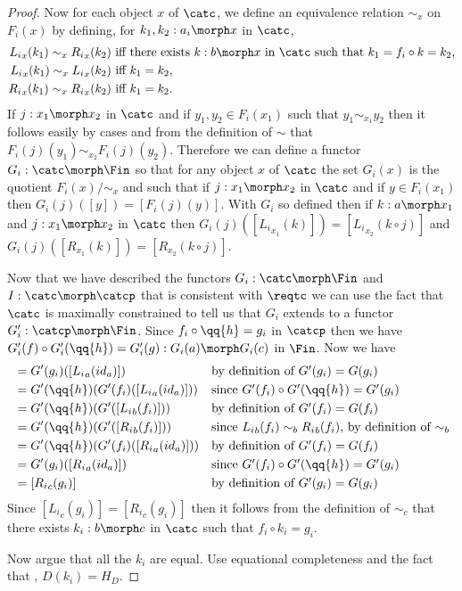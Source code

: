 \begin{proof}
Now for each object $x$ of $\catc$, we define an equivalence relation $\sim_x$ on $F_i(x)$ by defining,
for $k_1,k_2:a_i \morph x$ in $\catc$,
\begin{align*}
{L_i}_x(k_1) \sim_x {R_i}_x(k_2) & \mbox{ iff there exists $k:b \morph x$ in $\catc$ such that $k_1 = f_i \circ k = k_2$,}\\
{L_i}_x(k_1) \sim_x {L_i}_x(k_2) & \mbox{ iff $k_1 = k_2$,} \\
{R_i}_x(k_1) \sim_x {R_i}_x(k_2) & \mbox{ iff $k_1 = k_2$.} \\
\end{align*}
If $j: x_1 \morph x_2$ in $\catc$ and if $y_1,y_2 \in F_i(x_1)$ such that $y_1 \sim_{x_1} y_2$
then it follows easily by cases and from the definition of $\sim$ that $F_i(j)(y_1) \sim_{x_2} F_i(j)(y_2)$.
Therefore we can define a functor 
 $G_i: \catc \morph \Fin$  so that for any object $x$ of $\catc$
the set $G_i(x)$ is the quotient $F_i(x)/{\sim_x}$ and such that 
if $j: x_1 \morph x_2$ in $\catc$ and if $y \in F_i(x_1)$ then $G_i(j)([y])=[F_i(j)(y)]$.
With $G_i$ so defined then if $k: a \morph x_1$ and $j:x_1 \morph x_2$ in $\catc$
then  $G_i(j)([{L_i}_{x_1}(k)])=[{L_i}_{x_2}(k \circ j)]$ and $G_i(j)([R_{x_1}(k)])=[R_{x_2}(k \circ j)]$. 

Now that we have described the functors  $G_i: \catc \morph \Fin$ and $I:\catc \morph \catcp$ that is consistent with $\reqtc$
we can use the fact that $\catc$ is maximally constrained to tell us that $G_i$ extends to a functor 
$G'_i : \catcp \morph \Fin$. Since $f_i \circ \qq{h} = g_i$ in $\catcp$ then we have
 $G'_i(f) \circ G'_i(\qq{h}) = G'_i(g): G_i(a) \morph G_i(c)$ in $\Fin$.
Now we have
\begin{align*}
[{L_i}_c(g_i)]&= G'(g_i)([{L_i}_a(id_a)])              & & \mbox{by definition of $G'(g_i)=G(g_i)$}           \\
        &= G'(\qq{h}) (G'(f_i)([{L_i}_a(id_a)])) & & \mbox{since $G'(f_i) \circ G'(\qq{h}) = G'(g_i)$}  \\
				&= G'(\qq{h}) (G'([{L_i}_b(f_i)]))       & & \mbox{by definition of $G'(f_i)=G(f_i)$}           \\
				&= G'(\qq{h}) (G'([{R_i}_b(f_i)]))       & & \mbox{since ${L_i}_b(f_i) \sim_b {R_i}_b(f_i)$, by definition of $\sim_b$} \\
				&= G'(\qq{h}) (G'(f_i)([{R_i}_a(id_a)])) & & \mbox{by definition of $G'(f_i)=G(f_i)$}           \\
		    &= G'(g_i)([{R_i}_a(id_a)])              & & \mbox{since $G'(f_i) \circ G'(\qq{h}) = G'(g_i)$}  \\
				&= [{R_i}_c(g_i)]                        & & \mbox{by definition of $G'(g_i)=G(g_i)$}           \\
\end{align*} 
Since $[{L_i}_c(g_i)]=[{R_i}_c(g_i)]$ then it follows from the definition of $\sim_c$ that there exists $k_i:b \morph c$ in 
$\catc$ such that $f_i \circ k_i = g_i$.

Now argue that all the $k_i$ are equal. 
Use equational completeness and the fact that \foreachi, $D(k_i)=H_D$.


\end{proof}

